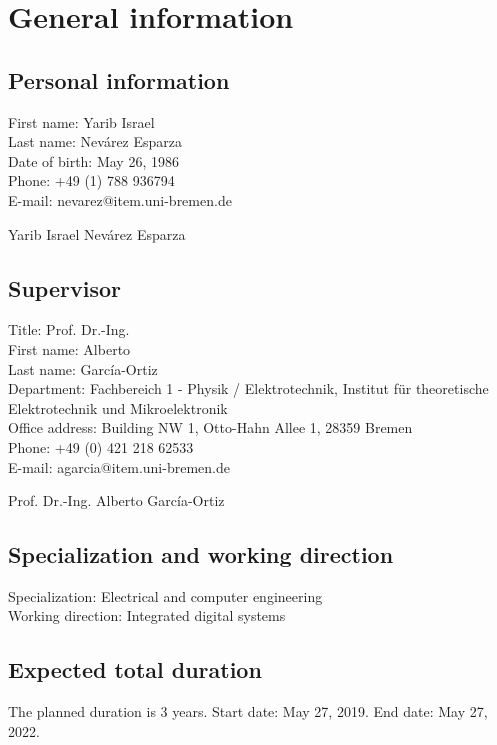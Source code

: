 \section{General information}
\subsection{Personal information}
First name: Yarib Israel\\
Last name: Nev\'arez Esparza\\
Date of birth: May 26, 1986\\
Phone: +49 (1) 788 936794\\
E-mail: nevarez@item.uni-bremen.de\\


\colorbox{signaturegray}{\makebox[0.4\textwidth]{\raisebox{-15mm}{\rule{7cm}{0.1pt}}}}
		
Yarib Israel Nev\'arez Esparza
	

\subsection{Supervisor}

Title: Prof. Dr.-Ing.\\
First name: Alberto\\
Last name: Garc\'ia-Ortiz\\
Department: Fachbereich 1 - Physik / Elektrotechnik,
Institut f\"ur theoretische Elektrotechnik und Mikroelektronik\\
Office address: Building NW 1, Otto-Hahn Allee 1, 28359 Bremen\\
Phone: +49 (0) 421 218 62533\\
E-mail: agarcia@item.uni-bremen.de\\


\colorbox{signaturegray}{\makebox[0.4\textwidth]{\raisebox{-15mm}{\rule{7cm}{0.1pt}}}}

Prof. Dr.-Ing. Alberto Garc\'ia-Ortiz

\subsection{Specialization and working direction}
Specialization: Electrical and computer engineering\\
Working direction: Integrated digital systems

\subsection{Expected total duration}
The planned duration is 3 years. Start date: May 27, 2019. End date: May 27, 2022.

\pagebreak